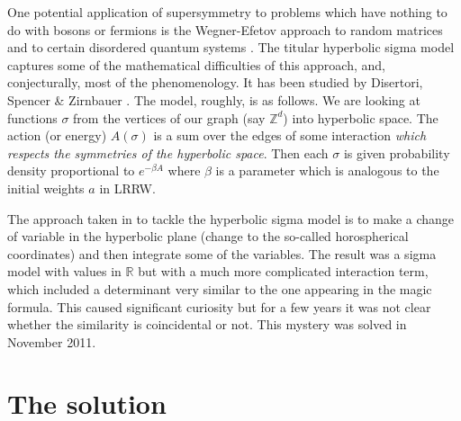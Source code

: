 \documentclass{emsprocart}
\theoremstyle{plain}
\begin{document}
One potential application of supersymmetry to problems which have
nothing to do with bosons or fermions is the Wegner-Efetov approach
to random matrices and to certain disordered quantum systems \cite{E97}.
The titular hyperbolic sigma model captures some of the mathematical
difficulties of this approach, and, conjecturally, most of the phenomenology.
It has been studied by Disertori, Spencer \& Zirnbauer \cite{SZ04,DS10,DSZ10}.
The model, roughly, is as follows. We are looking at functions $\sigma$
from the vertices of our graph (say $\mathbb{Z}^{d}$) into hyperbolic
space. The action (or energy) $A(\sigma)$ is a sum over the edges
of some interaction \emph{which respects the symmetries of the hyperbolic
space}. Then each $\sigma$ is given probability density proportional
to $e^{-\beta A}$ where $\beta$ is a parameter which is analogous
to the initial weights $a$ in LRRW.

The approach taken in \cite{SZ04} to tackle the hyperbolic sigma
model is to make a change of variable in the hyperbolic plane (change
to the so-called horospherical coordinates) and then integrate some of the
variables. The result was a sigma model with values in $\mathbb{R}$
but with a much more complicated interaction term, which included
a determinant very similar to the one appearing in the magic formula.
This caused significant curiosity but for a few years it was not
clear whether the similarity is coincidental or not. This mystery
was solved in November 2011.

\section{The solution}
\end{document}

